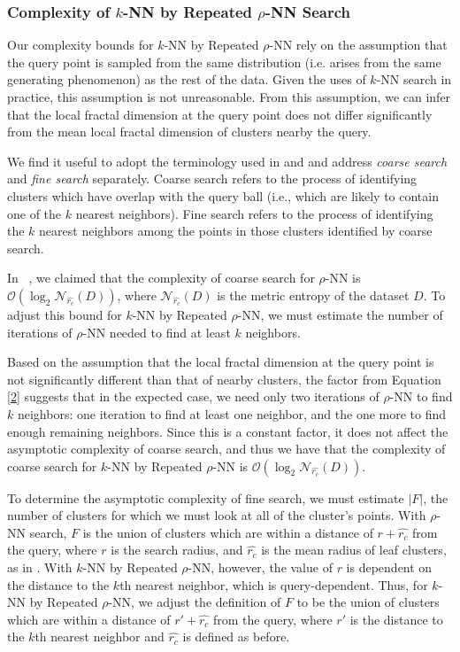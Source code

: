 \subsubsection{Complexity of $k$-NN by Repeated $\rho$-NN Search}
\label{paragraph:methods:repeated-rnn-complexity}

Our complexity bounds for $k$-NN by Repeated $\rho$-NN rely on the assumption that the query point is sampled from the same distribution
(i.e. arises from the same generating phenomenon) as the rest of the data. Given the uses of $k$-NN search in practice, 
this assumption is not unreasonable. From this assumption, we can infer that the local fractal dimension
at the query point does not differ significantly from the mean local fractal dimension of clusters nearby the query.

We find it useful to adopt the terminology used in 
\cite{ishaq2019clustered} and \cite{yu2015entropy} and address \emph{coarse search} and \emph{fine search} separately. 
Coarse search refers to the process of identifying clusters
which have overlap with the query ball (i.e., which are likely to contain one of the $k$ nearest neighbors). 
Fine search refers to the process
of identifying the $k$ nearest neighbors among the points in those clusters identified by coarse search.

In ~\cite{ishaq2019clustered}, we claimed that the complexity of coarse search for $\rho$-NN is $\mathcal{O}(\log_2\mathcal{N}_{\hat{r_c}}(D))$, 
where $\mathcal{N}_{\hat{r_c}}(D)$ is the metric entropy of the dataset $D$. 
To adjust this bound for $k$-NN by Repeated $\rho$-NN, we must estimate the number of iterations 
of $\rho$-NN needed to find at least $k$ neighbors. 
    

Based on the assumption that the local fractal dimension at the query point is not significantly different than that of 
nearby clusters, the factor from Equation \ref{2} suggests that in the expected case, we need only two iterations of 
$\rho$-NN to find $k$ neighbors: one iteration to find at least one neighbor, and the one more to find enough remaining neighbors.
Since this is a constant factor, it does not affect the asymptotic complexity of coarse search, and thus we have that 
the complexity of coarse search for $k$-NN by Repeated $\rho$-NN is $\mathcal{O}(\log_2\mathcal{N}_{\hat{r_c}}(D))$.

To determine the asymptotic complexity of fine search, we must estimate $|F|$, the 
number of clusters for which we must look at all of the cluster's points. With $\rho$-NN 
search, $F$ is the union of clusters which are within a distance of $r + \hat{r_c}$ from the query,
where $r$ is the search radius, and $\hat{r_c}$ is the mean radius of leaf clusters,
as in \cite{yu2015entropy}. With $k$-NN by Repeated $\rho$-NN, however, 
the value of $r$ is dependent on the distance to the $k$th nearest neighbor, which 
is query-dependent. Thus, for $k$-NN by Repeated $\rho$-NN, we adjust the definition of 
$F$ to be the union of clusters which are within a distance of $r' + \hat{r_c}$ from the query, 
where $r'$ is the distance to the $k$th nearest neighbor and $\hat{r_c}$ is defined as before.

